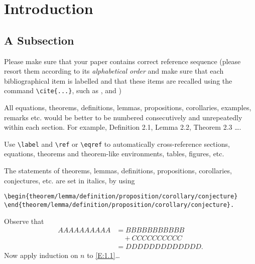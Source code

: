 \documentclass{amse-new}
\numberwithin{equation}{section} %
\begin{document}


\section{Introduction}

\subsection{A Subsection}

Please make sure that your paper contains correct reference
sequence (please resort them according to its {\it alphabetical
order} and make sure that each bibliographical item is labelled
and that these items are recalled using the command
\verb|\cite{...}|, such as \cite{LT}, and \cite{HB,T1,T2,T3})

All equations, theorems, definitions, lemmas, propositions,
corollaries, examples, remarks etc. would be better to be numbered
consecutively and unrepeatedly within each section. For example,
Definition 2.1, Lemma 2.2, Theorem 2.3 \ldots.

Use \verb|\label| and \verb|\ref| or \verb|\eqref| to
automatically cross-reference sections, equations, theorems and
theorem-like environments, tables, figures, etc.

\begin{theorem}[\cite{HB}]\label{th:1.1} %
The statements of theorems, lemmas, definitions, propositions,
corollaries, conjectures, etc. are set in italics, by using
\begin{verbatim}
\begin{theorem/lemma/definition/proposition/corollary/conjecture}
\end{theorem/lemma/definition/proposition/corollary/conjecture}.
\end{verbatim}
\end{theorem}

\begin{prof}  %
Observe that
\begin{align}\label{E:1.1}
AAAAAAAAAA &= BBBBBBBBBBB\nonumber \\
           &\quad + CCCCCCCCCC\nonumber \\
           &= DDDDDDDDDDDDD.
\end{align}
Now apply induction on $n$ to \eqref{E:1.1}\ldots
\end{prof}
\end{document}
